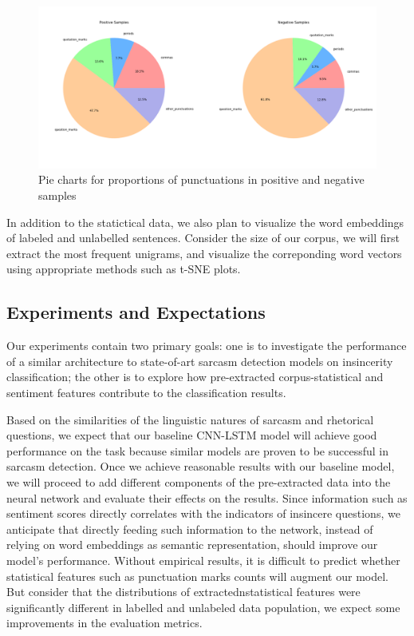 \documentclass[12pt]{diazessay} %
\begin{document}
\begin{figure}[ht] 
	\includegraphics[width=\textwidth, center]{graphs/puncpiecharts.png}
	\caption{Pie charts for proportions of punctuations in positive and negative samples}
	\medskip
	\small
	\label{figure:puncpie}
\end{figure}

In addition to the statictical data, we also plan to visualize the word embeddings of labeled and unlabelled sentences. Consider the size of our corpus, we will first extract the most frequent unigrams, and visualize the correponding word vectors using appropriate methods such as t-SNE plots. 



\subsection{Experiments and Expectations}

Our experiments contain two primary goals: one is to investigate the performance of a similar architecture to state-of-art sarcasm detection models on insincerity classification; the other is to explore how pre-extracted corpus-statistical and sentiment features contribute to the classification results. 

Based on the similarities of the linguistic natures of sarcasm and rhetorical questions, we expect that our baseline CNN-LSTM model will achieve good performance on the task because similar models are proven to be successful in sarcasm detection. Once we achieve reasonable results with our baseline model, we will proceed to add different components of the pre-extracted data into the neural network and evaluate their effects on the results. Since information such as sentiment scores directly correlates with the indicators of insincere questions, we anticipate that directly feeding such information to the network, instead of relying on word embeddings as semantic representation, should improve our model's performance. Without empirical results, it is difficult to predict whether statistical features such as punctuation marks counts will augment our model. But consider that the distributions of extractednstatistical features were significantly different in labelled and unlabeled data population, we expect some improvements in the evaluation metrics.
\end{document}
